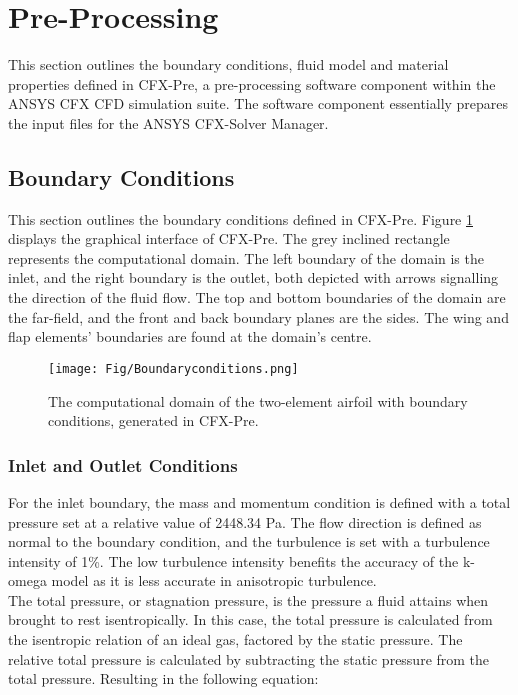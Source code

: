 \section{Pre-Processing}
This section outlines the boundary conditions, fluid model and material properties defined in CFX-Pre, a pre-processing software component within the ANSYS CFX CFD simulation suite. The software component essentially prepares the input files for the ANSYS CFX-Solver Manager. 

\subsection{Boundary Conditions}
This section outlines the boundary conditions defined in CFX-Pre. Figure \ref{fig:compdomain} displays the graphical interface of CFX-Pre. The grey inclined rectangle represents the computational domain. The left boundary of the domain is the inlet, and the right boundary is the outlet, both depicted with arrows signalling the direction of the fluid flow. The top and bottom boundaries of the domain are the far-field, and the front and back boundary planes are the sides. The wing and flap elements' boundaries are found at the domain's centre.


\begin{figure}[H]
  \centering
    \texttt{[image: Fig/Boundaryconditions.png]}
  \caption{The computational domain of the two-element airfoil with boundary conditions, generated in CFX-Pre.}
  \label{fig:compdomain}
\end{figure}



\subsubsection{Inlet and Outlet Conditions}
For the inlet boundary, the mass and momentum condition is defined with a total pressure set at a relative value of 2448.34 Pa. The flow direction is defined as normal to the boundary condition, and the turbulence is set with a turbulence intensity of 1\%. The low turbulence intensity benefits the accuracy of the k-omega model as it is less accurate in anisotropic turbulence. \\

The total pressure, or stagnation pressure, is the pressure a fluid attains when brought to rest isentropically. In this case, the total pressure is calculated from the isentropic relation of an ideal gas, factored by the static pressure. The relative total pressure is calculated by subtracting the static pressure from the total pressure. Resulting in the following equation:

